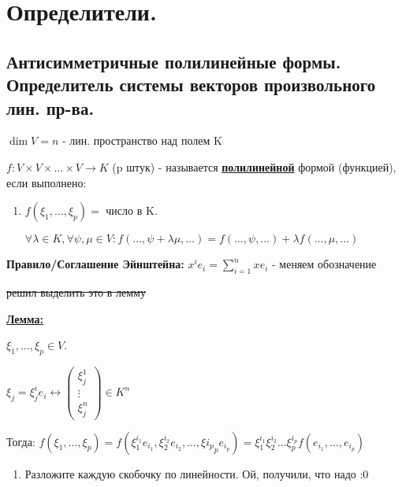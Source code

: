 \section{Определители.}

\subsection{Антисимметричные полилинейные формы. Определитель системы векторов произвольного лин. пр-ва.}

\(\dim V = n\) - лин. пространство над полем K

\(f: V \times V \times \ldots \times V \rightarrow K\) (p штук) - называется \uline{\textbf{полилинейной}} формой (функцией), если выполнено:

\begin{enumerate}
    \item[]

          \(f(\xi_1,\ldots,\xi_p) = \) число в K.

          \(\forall \lambda \in K, \forall \psi, \mu \in V: f(\ldots,\psi + \lambda \mu,\ldots) = f(\ldots, \psi, \ldots) + \lambda f(\ldots,\mu,\ldots)\)
\end{enumerate}



\textbf{Правило/Соглашение Эйнштейна:} \(x^i e_i = \sum\limits_{i=1}^n x e_i\) - меняем обозначение


\sout{решил выделить это в лемму} %

\uline{\textbf{Лемма:}}

$\xi_1,\ldots, \xi_p \in V$.

\(\xi_j  = \xi_j^ie_i \leftrightarrow \begin{pmatrix}
    \xi_j^1 \\
    \vdots  \\
    \xi_j^n
\end{pmatrix} \in K^n \)

Тогда: \(f(\xi_1,\ldots,\xi_p) = f(\xi_1^{i_1}e_{i_1}, \xi_2^{i_2}e_{i_2},\ldots, \xi{i_p}_p e_{i_p}) =  \xi_1^{i_1} \xi_2^{i_2}\ldots \xi_p^{i_p} f(e_{i_1},
\ldots,e_{i_p})\)

\begin{enumerate}
    \item[] \prooff{}
          Разложите каждую скобочку по линейности. Ой, получили, что надо :0
\end{enumerate}



